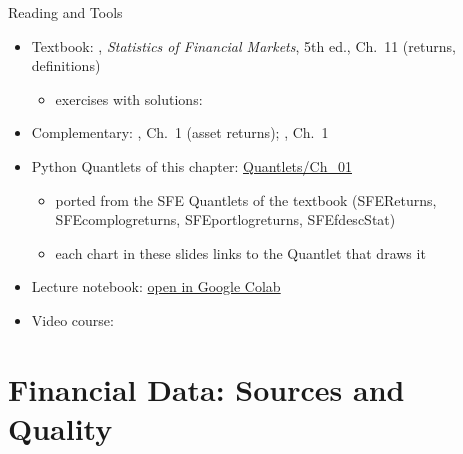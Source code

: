 \begin{frame}{Reading and Tools}
\itemsize{\small}
\begin{itemize}
    \item Textbook: , \textit{Statistics of Financial Markets}, 5th ed., Ch.~11 (returns, definitions)
    \begin{itemize}
        \item exercises with solutions: 
    \end{itemize}
    \item Complementary: , Ch.~1 (asset returns); , Ch.~1
    \item Python Quantlets of this chapter: \href{https://github.com/danpele/SFM/tree/main/Quantlets/Ch_01}{Quantlets/Ch\_01}
    \begin{itemize}
        \item ported from the SFE Quantlets of the textbook (SFEReturns, SFEcomplogreturns, SFEportlogreturns, SFEfdescStat)
        \item each chart in these slides links to the Quantlet that draws it
    \end{itemize}
    \item Lecture notebook: \href{\colaburl{notebooks/EN/chapter1_lecture_notebook.ipynb}}{open in Google Colab}
    \item Video course: 
\end{itemize}
\end{frame}


\section{Financial Data: Sources and Quality}

